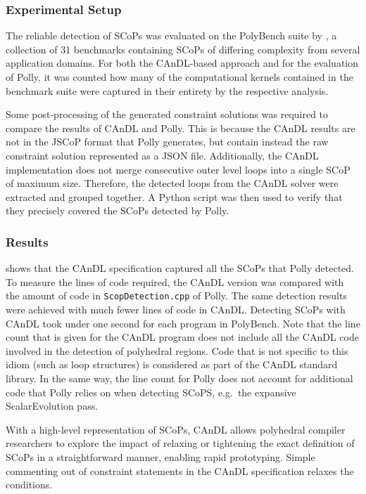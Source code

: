 \subsubsection{Experimental Setup}

    The reliable detection of SCoPs was evaluated on the PolyBench suite by
    \citet{polybench}, a collection of 31 benchmarks containing SCoPs of
    differing complexity from several application domains.
    For both the CAnDL-based approach and for the evaluation of Polly, it was
    counted how many of the computational kernels contained in the benchmark
    suite were captured in their entirety by the respective analysis.

    Some post-processing of the generated constraint solutions was required to
    compare the results of CAnDL and Polly.
    This is because the CAnDL results are not in the JSCoP format that Polly
    generates, but contain instead the raw constraint solution represented
    as a JSON file.
    Additionally, the CAnDL implementation does not merge consecutive
    outer level loops into a single SCoP of maximum size.
    Therefore, the detected loops from the CAnDL solver were extracted and
    grouped together.
    A Python script was then used to verify that they precisely covered the
    SCoPs detected by Polly.

\subsubsection{Results}

     shows that the CAnDL specification captured all the
    SCoPs that Polly detected.
    To measure the lines of code required, the CAnDL version was compared with
    the amount of code in \texttt{ScopDetection.cpp} of Polly.
    The same detection results were achieved with much fewer lines of code in
    CAnDL.
    Detecting SCoPs with CAnDL took under one second for each program in
    PolyBench.
    Note that the line count that is given for the CAnDL program does not
    include all the CAnDL code involved in the detection of polyhedral regions.
    Code that is not specific to this idiom (such as loop structures) is
    considered as part of the CAnDL standard library.
    In the same way, the line count for Polly does not account for additional
    code that Polly relies on when detecting SCoPS, e.g.\ the expansive
    ScalarEvolution pass.

    With a high-level representation of SCoPs, CAnDL allows polyhedral
    compiler researchers to explore the impact of relaxing or tightening the
    exact definition of SCoPs in a straightforward manner, enabling rapid
    prototyping.
    Simple commenting out of constraint statements in the CAnDL specification
    relaxes the conditions.


